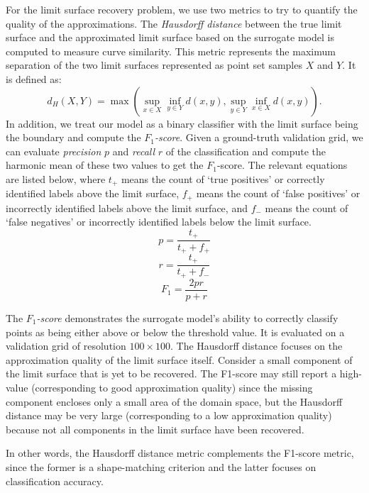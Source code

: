 For the limit surface recovery problem, we use two metrics to try to quantify the quality of the approximations.
%
The \emph{Hausdorff distance} between the true limit surface and the approximated limit surface based on the surrogate model is computed to measure curve similarity.
%
This metric represents the maximum separation of the two limit surfaces represented as point set samples $X$ and $Y$. It is defined as:
%
\begin{equation}
d_H(X,Y) = \max \left( \sup_{x \in X} \inf_{y \in Y}
d(x,y),\sup_{y \in Y} \inf_{x \in X} d(x,y)\right).
\end{equation}
%
In addition, we treat our model as a binary classifier with the limit surface being the boundary and compute the \emph{$F_1$-score}.
%
Given a ground-truth validation grid, we can evaluate \emph{precision} $p$ and \emph{recall} $r$ of the classification and compute the harmonic mean of these two values to get the $F_1$-score.
%
The relevant equations are listed below, where $t_+$ means the count of `true positives' or correctly identified labels above the limit surface, $f_+$ means the count of `false positives' or incorrectly identified labels above the limit surface, and $f_-$ means the count of `false negatives' or incorrectly identified labels below the limit surface.
%
\begin{equation}
p = \frac{t_+}{t_+ + f_+}
\end{equation}
%
\begin{equation}
r = \frac{t_+}{t_+ + f_-}
\end{equation}
%
\begin{equation}
F_1 = \frac{2pr}{p+r}
\end{equation}

The \emph{$F_1$-score} demonstrates the surrogate model's ability to correctly classify points as being either above or below the threshold value.
%
It is evaluated on a validation grid of resolution $100\times100$.
%
The Hausdorff distance focuses on the approximation quality of the limit surface itself.
%
Consider a small component of the limit surface that is yet to be recovered.
%
The F1-score may still report a high-value (corresponding to good approximation quality) since the missing component encloses only a small area of the domain space, but the Hausdorff distance may be very large (corresponding to a low approximation quality) because not all components in the limit surface have been recovered.

In other words, the Hausdorff distance metric complements the F1-score metric, since the former is a shape-matching criterion and the latter focuses on classification accuracy.
%

